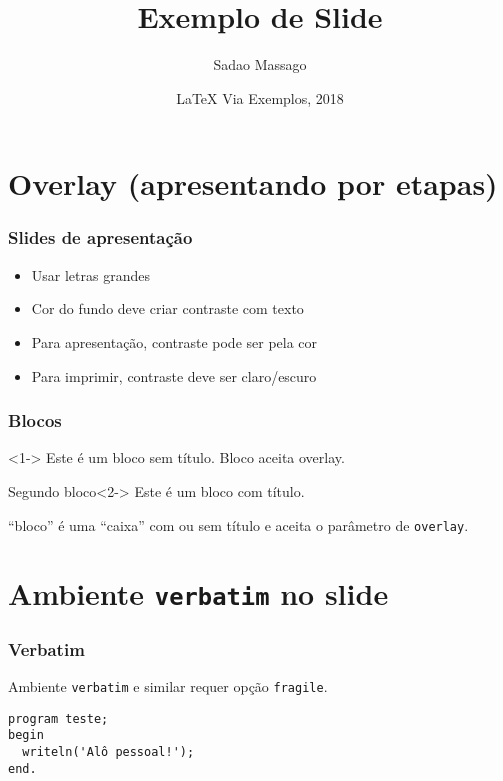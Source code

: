 \documentclass[12pt]{beamer} %
\title[Exemplo de Slide]{Exemplo de Slide}
\author{%
  Sadao Massago\inst{1} %
  }
\institute[DFQM-UFSCar]{
  \inst{1}%
  Departamento de Física, Química e Matemática \\
  Universidade Federal de São Carlos
  }
\date[Março 2018]{\LaTeX{} Via Exemplos, 2018}
\begin{document}
\frame{\titlepage} %
\frame{\transdissolve\tableofcontents} %


\section{Overlay (apresentando por etapas)} %

\begin{frame} %
  \frametitle{Slides de apresentação}
\begin{itemize}
\item <1->\alert<1>{Usar letras grandes}
\item <2->\alert<2>{Cor do fundo deve criar contraste com texto}
\item <3->\alert<3>{Para apresentação, contraste pode ser pela cor}
\item <4->\alert<4>{Para imprimir, contraste deve ser claro/escuro}
\end{itemize}
\end{frame}

\begin{frame}
\frametitle{Blocos}
\begin{block}{}<1->
Este é um bloco sem título. Bloco aceita overlay.
\end{block}

\begin{block}{Segundo bloco}<2->
Este é um bloco com título.
\end{block}

``bloco'' é uma ``caixa'' com ou sem título e aceita o parâmetro de \texttt{overlay}.

\end{frame}

\section{Ambiente \texttt{verbatim} no slide} %

\begin{frame}[fragile] %
\frametitle{Verbatim}
Ambiente \texttt{verbatim} e similar requer opção \texttt{fragile}.
\begin{verbatim}
program teste;
begin
  writeln('Alô pessoal!');
end.
\end{verbatim}
\end{frame}
\end{document}
